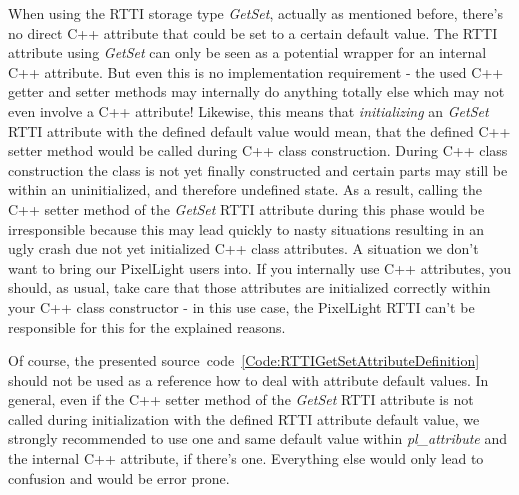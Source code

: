 When using the RTTI storage type \emph{GetSet}, actually as mentioned before, there's no direct C++ attribute that could be set to a certain default value. The RTTI attribute using \emph{GetSet} can only be seen as a potential wrapper for an internal C++ attribute. But even this is no implementation requirement - the used C++ getter and setter methods may internally do anything totally else which may not even involve a C++ attribute! Likewise, this means that \emph{initializing} an \emph{GetSet} RTTI attribute with the defined default value would mean, that the defined C++ setter method would be called during C++ class construction. During C++ class construction the class is not yet finally constructed and certain parts may still be within an uninitialized, and therefore undefined state. As a result, calling the C++ setter method of the \emph{GetSet} RTTI attribute during this phase would be irresponsible because this may lead quickly to nasty situations resulting in an ugly crash due not yet initialized C++ class attributes. A situation we don't want to bring our PixelLight users into. If you internally use C++ attributes, you should, as usual, take care that those attributes are initialized correctly within your C++ class constructor - in this use case, the PixelLight RTTI can't be responsible for this for the explained reasons.

Of course, the presented source~code~\ref{Code:RTTIGetSetAttributeDefinition} should not be used as a reference how to deal with attribute default values. In general, even if the C++ setter method of the \emph{GetSet} RTTI attribute is not called during initialization with the defined RTTI attribute default value, we strongly recommended to use one and same default value within \emph{pl\_attribute} and the internal C++ attribute, if there's one. Everything else would only lead to confusion and would be error prone.


